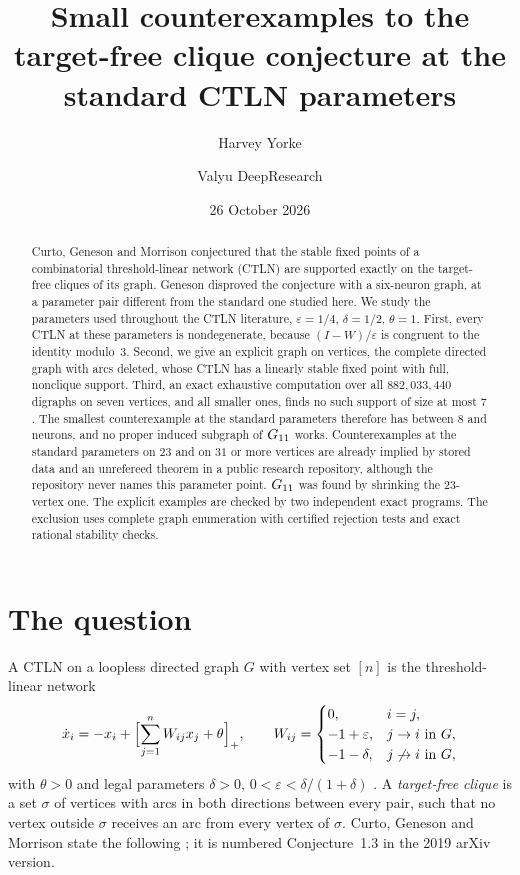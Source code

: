 \documentclass[11pt]{amsart}
\title[Target-free clique counterexamples at the standard parameters]{Small counterexamples to the target-free clique conjecture at the standard CTLN parameters}
\author{Harvey Yorke}
\author{Valyu DeepResearch}
\date{26 October 2026}
\theoremstyle{remark}
\begin{document}
\raggedbottom
\begin{abstract}
Curto, Geneson and Morrison conjectured that the stable fixed points of a combinatorial threshold-linear network (CTLN) are supported exactly on the target-free cliques of its graph. Geneson disproved the conjecture with a six-neuron graph, at a parameter pair different from the standard one studied here. We study the parameters used throughout the CTLN literature, $\varepsilon=1/4$, $\delta=1/2$, $\theta=1$. First, every CTLN at these parameters is nondegenerate, because $(I-W)/\varepsilon$ is congruent to the identity modulo~$3$. Second, we give an explicit graph on \NSMALL{} vertices, the complete directed graph with \MSMALL{} arcs deleted, whose CTLN has a linearly stable fixed point with full, nonclique support. Third, an exact exhaustive computation over all $882{,}033{,}440$ digraphs on seven vertices, and all smaller ones, finds no such support of size at most $7$. The smallest counterexample at the standard parameters therefore has between $8$ and \NSMALL{} neurons, and no proper induced subgraph of $G_{11}$ works. Counterexamples at the standard parameters on $23$ and on $31$ or more vertices are already implied by stored data and an unrefereed theorem in a public research repository, although the repository never names this parameter point. $G_{11}$ was found by shrinking the 23-vertex one. The explicit examples are checked by two independent exact programs. The exclusion uses complete graph enumeration with certified rejection tests and exact rational stability checks.
\end{abstract}
\maketitle

\section{The question}

A CTLN on a loopless directed graph $G$ with vertex set $[n]$ is the threshold-linear network
\begin{equation}\label{eq:ctln}
 \dot x_i=-x_i+\Bigl[\sum_{j=1}^n W_{ij}x_j+\theta\Bigr]_+,\qquad
 W_{ij}=\begin{cases}0,& i=j,\\ -1+\varepsilon,& j\to i\text{ in }G,\\ -1-\delta,& j\not\to i\text{ in }G,\end{cases}
\end{equation}
with $\theta>0$ and legal parameters $\delta>0$, $0<\varepsilon<\delta/(1+\delta)$ \cite{CGM2019,CurtoMorrison2023}. A \emph{target-free clique} is a set $\sigma$ of vertices with arcs in both directions between every pair, such that no vertex outside $\sigma$ receives an arc from every vertex of $\sigma$. Curto, Geneson and Morrison state the following \cite[Conjecture~1.2]{CGM2024}; it is numbered Conjecture~1.3 in the 2019 arXiv version.
\end{document}

